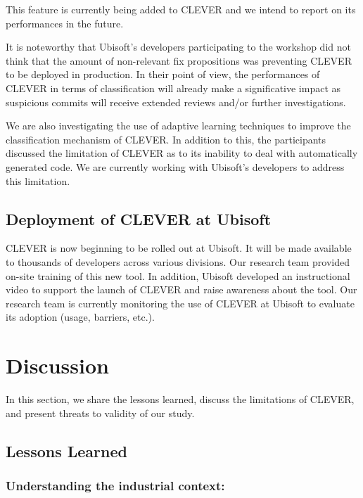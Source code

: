 \documentclass[sigconf]{acmart}
\begin{document}
This feature is currently being added to CLEVER and we intend to report
on its performances in the future.

It is noteworthy that Ubisoft's developers participating to the workshop
did not think that the amount of non-relevant fix propositions was
preventing CLEVER to be deployed in production. In their point of view,
the performances of CLEVER in terms of classification will already make
a significative impact as suspicious commits will receive extended
reviews and/or further investigations.

We are also investigating the use of adaptive learning techniques to
improve the classification mechanism of CLEVER. In addition to this, the
participants discussed the limitation of CLEVER as to its inability to
deal with automatically generated code. We are currently working with
Ubisoft's developers to address this limitation.

\subsection{Deployment of CLEVER at
Ubisoft}\label{deployment-of-clever-at-ubisoft}

CLEVER is now beginning to be rolled out at Ubisoft. It will be made
available to thousands of developers across various divisions. Our
research team provided on-site training of this new tool. In addition,
Ubisoft developed an instructional video to support the launch of CLEVER
and raise awareness about the tool. Our research team is currently
monitoring the use of CLEVER at Ubisoft to evaluate its adoption (usage,
barriers, etc.).

\section{Discussion}\label{sec:threats}

In this section, we share the lessons learned, discuss the limitations
of CLEVER, and present threats to validity of our study.

\subsection{Lessons Learned}\label{lessons-learned}

\subsubsection{Understanding the industrial
context:}\label{understanding-the-industrial-context}
\end{document}
